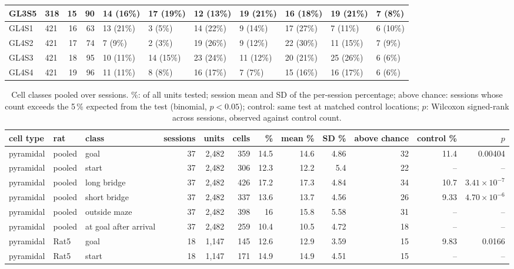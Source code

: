 \begin{table}[htbp]
\begin{tabular}{llrrlllllll}
GL3S5 & 318 & 15 & 90 & 14 (16\%) & 17 (19\%) & 12 (13\%) & 19 (21\%) & 16 (18\%) & 19 (21\%) & 7 (8\%) \\
\midrule
GL4S1 & 421 & 16 & 63 & 13 (21\%) & 3 (5\%) & 14 (22\%) & 9 (14\%) & 17 (27\%) & 7 (11\%) & 6 (10\%) \\
GL4S2 & 421 & 17 & 74 & 7 (9\%) & 2 (3\%) & 19 (26\%) & 9 (12\%) & 22 (30\%) & 11 (15\%) & 7 (9\%) \\
GL4S3 & 421 & 18 & 95 & 10 (11\%) & 14 (15\%) & 23 (24\%) & 11 (12\%) & 20 (21\%) & 25 (26\%) & 6 (6\%) \\
GL4S4 & 421 & 19 & 96 & 11 (11\%) & 8 (8\%) & 16 (17\%) & 7 (7\%) & 15 (16\%) & 16 (17\%) & 6 (6\%) \\
\bottomrule
\end{tabular}
\end{table}
\begin{table}[htbp]
\centering
\scriptsize
\caption{Cell classes pooled over sessions. \%: of all units tested; session mean and SD of the per-session percentage; above chance: sessions whose count exceeds the 5\,\% expected from the test (binomial, $p<0.05$); control: same test at matched control locations; $p$: Wilcoxon signed-rank across sessions, observed against control count.}
\label{tab:cell_classes:summary}
\begin{tabular}{lllrrrrrrrrr}
\toprule
cell type & rat & class & sessions & units & cells & \% & mean \% & SD \% & above chance & control \% & $p$ \\
\midrule
pyramidal & pooled & goal & 37 & 2{,}482 & 359 & 14.5 & 14.6 & 4.86 & 32 & 11.4 & 0.00404 \\
pyramidal & pooled & start & 37 & 2{,}482 & 306 & 12.3 & 12.2 & 5.4 & 22 & -- & -- \\
pyramidal & pooled & long bridge & 37 & 2{,}482 & 426 & 17.2 & 17.3 & 4.84 & 34 & 10.7 & $3.41\times10^{-7}$ \\
pyramidal & pooled & short bridge & 37 & 2{,}482 & 337 & 13.6 & 13.7 & 4.56 & 26 & 9.33 & $4.70\times10^{-6}$ \\
pyramidal & pooled & outside maze & 37 & 2{,}482 & 398 & 16 & 15.8 & 5.58 & 31 & -- & -- \\
pyramidal & pooled & at goal after arrival & 37 & 2{,}482 & 259 & 10.4 & 10.5 & 4.72 & 18 & -- & -- \\
pyramidal & Rat5 & goal & 18 & 1{,}147 & 145 & 12.6 & 12.9 & 3.59 & 15 & 9.83 & 0.0166 \\
pyramidal & Rat5 & start & 18 & 1{,}147 & 171 & 14.9 & 14.9 & 4.51 & 15 & -- & -- \\

\end{tabular}
\end{table}

